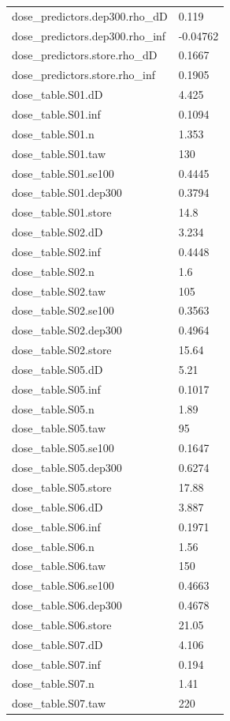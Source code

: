 {\begin{longtable}{p{}p{}}
{}dose\_predictors.dep300.rho\_dD & 0.119\\
{}dose\_predictors.dep300.rho\_inf & -0.04762\\
{}dose\_predictors.store.rho\_dD & 0.1667\\
{}dose\_predictors.store.rho\_inf & 0.1905\\
{}dose\_table.S01.dD & 4.425\\
{}dose\_table.S01.inf & 0.1094\\
{}dose\_table.S01.n & 1.353\\
{}dose\_table.S01.taw & 130\\
{}dose\_table.S01.se100 & 0.4445\\
{}dose\_table.S01.dep300 & 0.3794\\
{}dose\_table.S01.store & 14.8\\
{}dose\_table.S02.dD & 3.234\\
{}dose\_table.S02.inf & 0.4448\\
{}dose\_table.S02.n & 1.6\\
{}dose\_table.S02.taw & 105\\
{}dose\_table.S02.se100 & 0.3563\\
{}dose\_table.S02.dep300 & 0.4964\\
{}dose\_table.S02.store & 15.64\\
{}dose\_table.S05.dD & 5.21\\
{}dose\_table.S05.inf & 0.1017\\
{}dose\_table.S05.n & 1.89\\
{}dose\_table.S05.taw & 95\\
{}dose\_table.S05.se100 & 0.1647\\
{}dose\_table.S05.dep300 & 0.6274\\
{}dose\_table.S05.store & 17.88\\
{}dose\_table.S06.dD & 3.887\\
{}dose\_table.S06.inf & 0.1971\\
{}dose\_table.S06.n & 1.56\\
{}dose\_table.S06.taw & 150\\
{}dose\_table.S06.se100 & 0.4663\\
{}dose\_table.S06.dep300 & 0.4678\\
{}dose\_table.S06.store & 21.05\\
{}dose\_table.S07.dD & 4.106\\
{}dose\_table.S07.inf & 0.194\\
{}dose\_table.S07.n & 1.41\\
{}dose\_table.S07.taw & 220\\

\end{longtable}}
